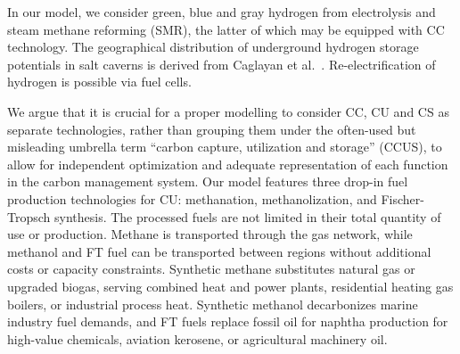 \documentclass[twocolumn]{article}
\begin{document}

In our model, we consider green, blue and gray hydrogen from electrolysis and steam methane reforming (SMR), the latter of which may be equipped with CC technology. The geographical distribution of underground hydrogen storage potentials in salt caverns is derived from Caglayan et al.~\cite{caglayanTechnicalPotentialSalt2020}. Re-electrification of hydrogen is possible via fuel cells.


We argue that it is crucial for a proper modelling to consider CC, CU and CS as separate technologies, rather than grouping them under the often-used but misleading umbrella term ``carbon capture, utilization and storage'' (CCUS), to allow for independent optimization and adequate representation of each function in the carbon management system.
Our model features three drop-in fuel production technologies for CU: methanation, methanolization, and Fischer-Tropsch synthesis.
The processed fuels are not limited in their total quantity of use or production.
Methane is transported through the gas network, while methanol and FT fuel can be transported between regions without additional costs or capacity constraints.
Synthetic methane substitutes natural gas or upgraded biogas, serving combined heat and power plants, residential heating gas boilers, or industrial process heat.
Synthetic methanol decarbonizes marine industry fuel demands, and FT fuels replace fossil oil for naphtha production for high-value chemicals, aviation kerosene, or agricultural machinery oil.
\end{document}
